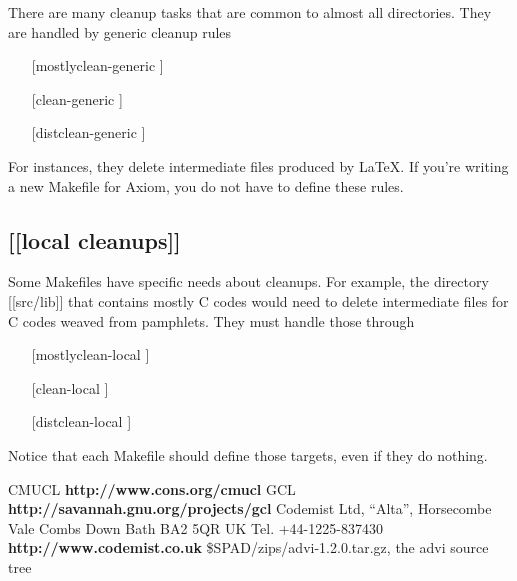 \documentclass{article}
\begin{document}
There are many cleanup tasks that are common to almost all directories.
They are handled by generic cleanup rules
\begin{itemize}
\item [[mostlyclean-generic]]
\item [[clean-generic]]
\item [[distclean-generic]]
\end{itemize}
For instances, they delete intermediate files produced by \LaTeX{}.
If you're writing a new Makefile for Axiom, you do not have to
define these rules.

\subsection{[[local cleanups]]}

Some Makefiles have specific needs about cleanups.  For example, the
directory [[src/lib]] that contains mostly C codes would need to delete
intermediate files for C codes weaved from pamphlets.  They must
handle those through
\begin{itemize}
\item [[mostlyclean-local]]
\item [[clean-local]]
\item [[distclean-local]]
\end{itemize}

Notice that each Makefile should define those targets, even if they do
nothing.


\eject
\begin{thebibliography}{99}
 CMUCL {\bf http://www.cons.org/cmucl}
 GCL {\bf http://savannah.gnu.org/projects/gcl}
 Codemist Ltd, ``Alta'', Horsecombe Vale Combs Down
Bath BA2 5QR UK Tel. +44-1225-837430
{\bf http://www.codemist.co.uk}
 \$SPAD/zips/advi-1.2.0.tar.gz, the advi source tree
\end{thebibliography}
\end{document}

